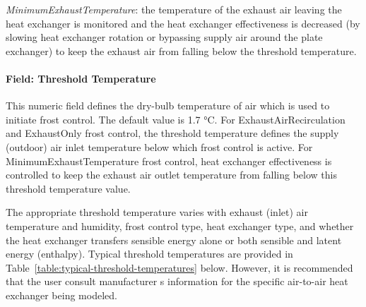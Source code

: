 \emph{MinimumExhaustTemperature}: the temperature of the exhaust air leaving the heat exchanger is monitored and the heat exchanger effectiveness is decreased (by slowing heat exchanger rotation or bypassing supply air around the plate exchanger) to keep the exhaust air from falling below the threshold temperature.

\paragraph{Field: Threshold Temperature}\label{field-threshold-temperature}

This numeric field defines the dry-bulb temperature of air which is used to initiate frost control. The default value is 1.7 °C. For ExhaustAirRecirculation and ExhaustOnly frost control, the threshold temperature defines the supply (outdoor) air inlet temperature below which frost control is active. For MinimumExhaustTemperature frost control, heat exchanger effectiveness is controlled to keep the exhaust air outlet temperature from falling below this threshold temperature value.

The appropriate threshold temperature varies with exhaust (inlet) air temperature and humidity, frost control type, heat exchanger type, and whether the heat exchanger transfers sensible energy alone or both sensible and latent energy (enthalpy). Typical threshold temperatures are provided in Table~\ref{table:typical-threshold-temperatures} below. However, it is recommended that the user consult manufacturer s information for the specific air-to-air heat exchanger being modeled.


